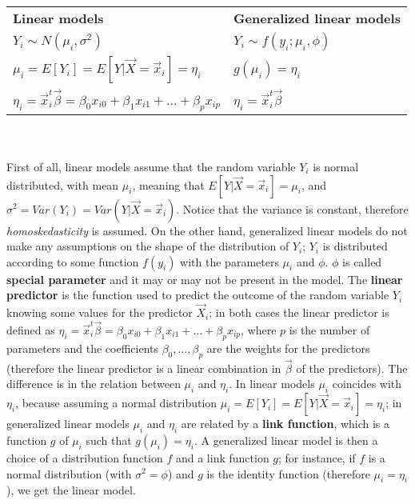     \begin{tabularx}{1\textwidth} { 
    >{\centering\arraybackslash}X 
    >{\centering\arraybackslash}X }

    \textbf{Linear models} & 
    \textbf{Generalized linear models} \\

    $Y_i \sim N(\mu_i, \sigma^2)$ & 
    $Y_i \sim f(y_i; \mu_i, \phi)$ \\

    $\mu_i = E[Y_i] = E[Y|\vec{X} = \vec{x}_i] = \eta_i$ & 
    $g(\mu_i) = \eta_i$ \\

    $\eta_i = \vec{x}_i^t\vec{\beta} = \beta_0x_{i0} + \beta_1x_{i1} + \dots + \beta_px_{ip}$ & 
    $\eta_i = \vec{x}_i^t\vec{\beta}$  \\
    \end{tabularx}
\\
\\
    First of all, linear models assume that the random variable $Y_i$ is normal distributed, with mean $\mu_i$, meaning that $E[Y|\vec{X}=\vec{x}_i] = \mu_i$, and $\sigma^2 = Var(Y_i) = Var(Y|\vec{X}=\vec{x}_i)$. Notice that the variance is constant, therefore  \emph{homoskedasticity} is assumed. On the other hand, generalized linear models do not make any assumptions on the shape of the distribution of $Y_i$; $Y_i$ is distributed according to some function $f(y_i)$ with the parameters $\mu_i$ and $\phi$. $\phi$ is called \textbf{special parameter} and it may or may not be present in the model.
    The \textbf{linear predictor} is the function used to predict the outcome of the random variable $Y_i$ knowing some values for the predictor $\vec{X}_i$; in both cases the linear predictor is defined as $\eta_i = \vec{x}_i^t\vec{\beta} = \beta_0x_{i0} + \beta_1x_{i1} + \dots + \beta_px_{ip}$, where $p$ is the number of parameters and the coefficients $\beta_0, \dots, \beta_p$ are the weights for the predictors (therefore the linear predictor is a linear combination in $\vec{\beta}$ of the predictors). The difference is in the relation between $\mu_i$ and $\eta_i$. In linear models $\mu_i$ coincides with $\eta_i$, because assuming a normal distribution $\mu_i = E[Y_i] = E[Y|\vec{X} = \vec{x}_i] = \eta_i$; in generalized linear models $\mu_i$ and $\eta_i$ are related by a \textbf{link function}, which is a function $g$ of $\mu_i$ such that $g(\mu_i) = \eta_i$.
    A generalized linear model is then a choice of a distribution function $f$ and a link function $g$; for instance, if $f$ is a normal distribution (with $\sigma^2 = \phi$) and $g$ is the identity function (therefore $\mu_i = \eta_i$), we get the linear model. 
  
